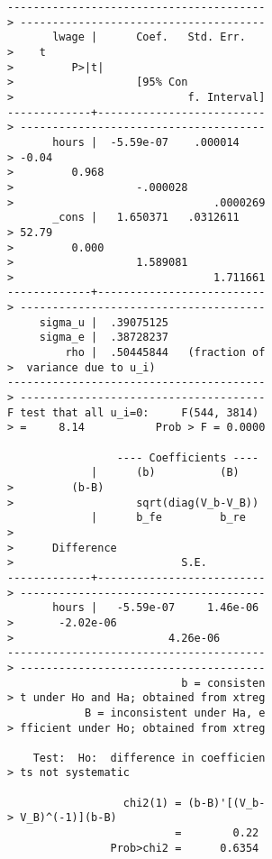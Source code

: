 \documentclass[]{article}
\begin{document}
\begin{verbatim}
----------------------------------------
> --------------------------------------
       lwage |      Coef.   Std. Err.   
>    t                                  
>         P>|t|                         
>                   [95% Con            
>                           f. Interval]
-------------+--------------------------
> --------------------------------------
       hours |  -5.59e-07    .000014    
> -0.04                                 
>         0.968                         
>                   -.000028            
>                               .0000269
       _cons |   1.650371   .0312611    
> 52.79                                 
>         0.000                         
>                   1.589081            
>                               1.711661
-------------+--------------------------
> --------------------------------------
     sigma_u |  .39075125
     sigma_e |  .38728237
         rho |  .50445844   (fraction of
>  variance due to u_i)
----------------------------------------
> --------------------------------------
F test that all u_i=0:     F(544, 3814) 
> =     8.14           Prob > F = 0.0000

                 ---- Coefficients ----
             |      (b)          (B)    
>         (b-B)                         
>                   sqrt(diag(V_b-V_B))
             |      b_fe         b_re   
>                                       
>      Difference                       
>                          S.E.
-------------+--------------------------
> --------------------------------------
       hours |   -5.59e-07     1.46e-06 
>       -2.02e-06                       
>                        4.26e-06
----------------------------------------
> --------------------------------------
                           b = consisten
> t under Ho and Ha; obtained from xtreg
            B = inconsistent under Ha, e
> fficient under Ho; obtained from xtreg

    Test:  Ho:  difference in coefficien
> ts not systematic

                  chi2(1) = (b-B)'[(V_b-
> V_B)^(-1)](b-B)
                          =        0.22
                Prob>chi2 =      0.6354
\end{verbatim}
\end{document}
